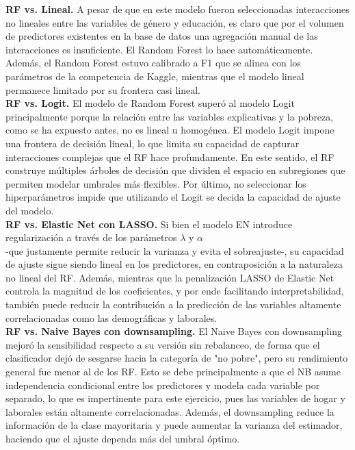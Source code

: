 \documentclass[12pt,a4paper,onecolumn]{article}
\begin{document}
\textbf{RF vs. Lineal.} A pesar de que en este modelo fueron seleccionadas interacciones no lineales entre las variables de género y educación, es claro que por el volumen de predictores existentes en la base de datos una agregación manual de las interacciones es insuficiente. El Random Forest lo hace automáticamente. Además, el Random Forest estuvo calibrado a F1 que se alinea con los parámetros de la competencia de Kaggle, mientras que el modelo lineal permanece limitado por su frontera casi lineal.\\

\textbf{RF vs. Logit.} El modelo de Random Forest superó al modelo Logit principalmente porque la relación entre las variables explicativas y la pobreza, como se ha expuesto antes, no es lineal u homogénea. El modelo Logit impone una frontera de decisión lineal, lo que limita su capacidad de capturar interacciones complejas que el RF hace profundamente. En este sentido, el RF construye múltiples árboles de decisión que dividen el espacio en subregiones que permiten modelar umbrales más flexibles. Por último, no seleccionar los hiperparámetros impide que utilizando el Logit se decida la capacidad de ajuste del modelo. \\

\textbf{RF vs. Elastic Net con LASSO.} Si bien el modelo EN introduce regularización a través de los parámetros \(\lambda\) y \(\alpha\)\\ -que justamente permite reducir la varianza y evita el sobreajuste-, su capacidad de ajuste sigue siendo lineal en los predictores, en contraposición a la naturaleza no lineal del RF. Además, mientras que la penalización LASSO de Elastic Net controla la magnitud de los coeficientes, y por ende facilitando interpretabilidad, también puede reducir la contribución a la predicción de las variables altamente correlacionadas como las demográficas y laborales.\\ 

\textbf{RF vs. Naive Bayes con downsampling.} El Naive Bayes con downsampling mejoró la sensibilidad respecto a su versión sin rebalanceo, de forma que el clasificador dejó de sesgarse hacia la categoría de "no pobre", pero su rendimiento general fue menor al de los RF. Esto se debe principalmente a que el NB asume independencia condicional entre los predictores y modela cada variable por separado, lo que es impertinente para este ejercicio, pues las variables de hogar y laborales están altamente correlacionadas. Además, el downsampling reduce la información de la clase mayoritaria y puede aumentar la varianza del estimador, haciendo que el ajuste dependa más del umbral óptimo.\\
\end{document}
